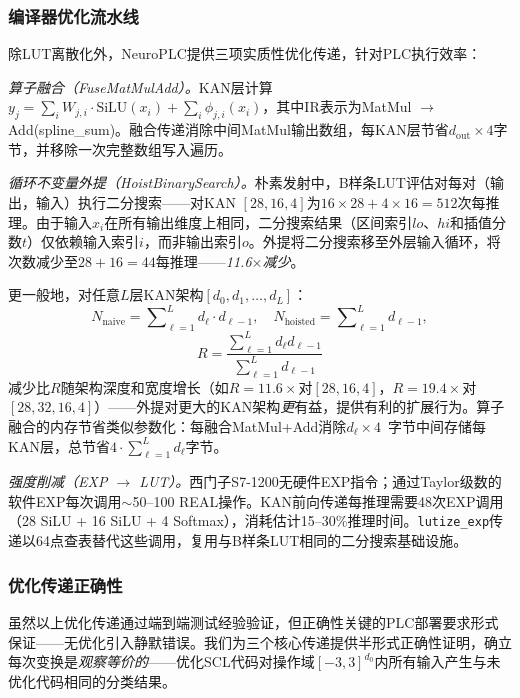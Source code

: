 \documentclass[journal,onecolumn]{IEEEtran}
\newcommand{\neuroplc}{NeuroPLC\xspace}
\theoremstyle{definition}
\theoremstyle{plain}
\theoremstyle{remark}
\begin{document}
\subsubsection{编译器优化流水线}

除LUT离散化外，\neuroplc{}提供三项实质性优化传递，针对PLC执行效率：

\textit{算子融合（FuseMatMulAdd）。}KAN层计算$y_j = \sum_i W_{j,i} \cdot \text{SiLU}(x_i) + \sum_i \phi_{j,i}(x_i)$，其中IR表示为MatMul $\rightarrow$ Add(spline\_sum)。融合传递消除中间MatMul输出数组，每KAN层节省$d_{\text{out}} \times 4$字节，并移除一次完整数组写入遍历。

\textit{循环不变量外提（HoistBinarySearch）。}朴素发射中，B样条LUT评估对每对（输出，输入）执行二分搜索——对KAN $[28,16,4]$为$16 \times 28 + 4 \times 16 = 512$次每推理。由于输入$x_i$在所有输出维度上相同，二分搜索结果（区间索引$lo$、$hi$和插值分数$t$）仅依赖输入索引$i$，而非输出索引$o$。外提将二分搜索移至外层输入循环，将次数减少至$28 + 16 = 44$每推理——\textit{11.6$\times$减少}。

更一般地，对任意$L$层KAN架构$[d_0,d_1,\dots,d_L]$：
\begin{equation}
N_{\text{naive}} = \sum\nolimits_{\ell=1}^L d_{\ell} \cdot d_{\ell-1}, \quad
N_{\text{hoisted}} = \sum\nolimits_{\ell=1}^L d_{\ell-1},
\end{equation}
\begin{equation}
R = \frac{\sum_{\ell=1}^L d_{\ell}d_{\ell-1}}{\sum_{\ell=1}^L d_{\ell-1}}
\label{eq:hoisting_ratio}
\end{equation}
减少比$R$随架构深度和宽度增长（如$R=11.6\times$对$[28,16,4]$，$R=19.4\times$对$[28,32,16,4]$）——外提对更大的KAN架构\textit{更}有益，提供有利的扩展行为。算子融合的内存节省类似参数化：每融合MatMul+Add消除$d_{\ell} \times 4$~字节中间存储每KAN层，总节省$4 \cdot \sum_{\ell=1}^L d_{\ell}$字节。

\textit{强度削减（EXP $\rightarrow$ LUT）。}西门子S7-1200无硬件EXP指令；通过Taylor级数的软件EXP每次调用$\sim$50--100 REAL操作。KAN前向传递每推理需要48次EXP调用（28 SiLU + 16 SiLU + 4 Softmax），消耗估计15--30\%推理时间。\texttt{lutize\_exp}传递以64点查表替代这些调用，复用与B样条LUT相同的二分搜索基础设施。

\subsubsection{优化传递正确性}

虽然以上优化传递通过端到端测试经验验证，但正确性关键的PLC部署要求形式保证——无优化引入静默错误。我们为三个核心传递提供半形式正确性证明，确立每次变换是\textit{观察等价的}——优化SCL代码对操作域$[-3,3]^{d_0}$内所有输入产生与未优化代码相同的分类结果。
\end{document}

